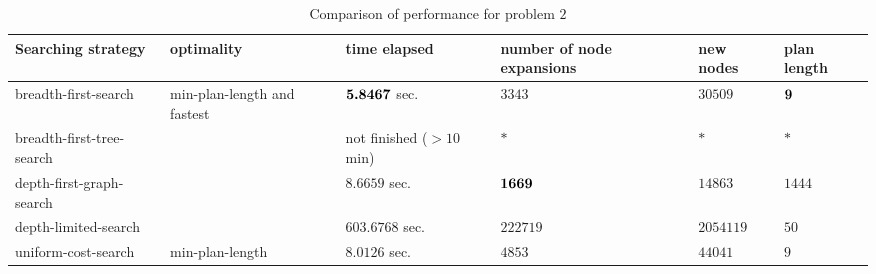 \documentclass[11pt]{article}
\begin{document}
\begin{table*}[h]
 \footnotesize 
 \centering
\begin{tabular*}{0.995\textwidth}{|m{97pt}<{\centering}|m{60pt}<{\centering}|m{60pt}<{\centering}|m{60pt}<{\centering}|m{60pt}<{\centering}|m{60pt}<{\centering}|}
\hline 
Searching strategy & optimality & time elapsed  & number of node expansions &  new nodes & plan length \\ 
\hline 
\vspace{5pt} breadth-first-search \vspace{5pt} & min-plan-length and fastest & $\boldsymbol{5.8467}$ sec.  & $3343$ & $30509$  & $\boldsymbol{9}$ \\ 
\hline 
\vspace{5pt} breadth-first-tree-search \vspace{5pt} &  & not finished ($>10$ min) & $*$ & $*$  & $*$ \\ 
\hline 
\vspace{5pt} depth-first-graph-search \vspace{5pt} &  & $8.6659$ sec.  & $\boldsymbol{1669}$ & $14863$  & $1444$ \\ 
\hline 
\vspace{5pt} depth-limited-search \vspace{5pt} &  & $603.6768$ sec.  & $222719$ & $2054119$  & $50$ \\ 
\hline 
\vspace{5pt} uniform-cost-search \vspace{5pt} & min-plan-length  & $8.0126$ sec.  & $4853$ & $44041$  & $9$ \\ 
\hline 
\end{tabular*} \vspace{-5pt}
\caption{\footnotesize Comparison of performance for problem $2$} 
\label{tab: p2}
\end{table*}
\end{document}
